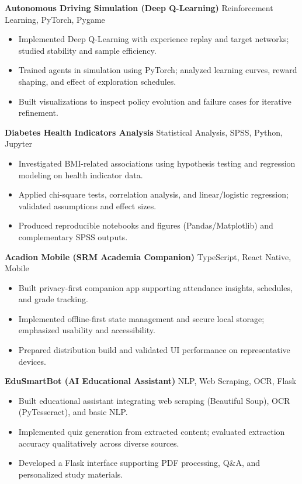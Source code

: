 \documentclass[10pt,a4paper]{article}
\begin{document}
\textbf{Autonomous Driving Simulation (Deep Q-Learning)} \hfill Reinforcement Learning, PyTorch, Pygame\\
\begin{itemize}
  \item Implemented Deep Q-Learning with experience replay and target networks; studied stability and sample efficiency.
  \item Trained agents in simulation using PyTorch; analyzed learning curves, reward shaping, and effect of exploration schedules.
  \item Built visualizations to inspect policy evolution and failure cases for iterative refinement.
\end{itemize}

\textbf{Diabetes Health Indicators Analysis} \hfill Statistical Analysis, SPSS, Python, Jupyter\\
\begin{itemize}
  \item Investigated BMI-related associations using hypothesis testing and regression modeling on health indicator data.
  \item Applied chi-square tests, correlation analysis, and linear/logistic regression; validated assumptions and effect sizes.
  \item Produced reproducible notebooks and figures (Pandas/Matplotlib) and complementary SPSS outputs.
\end{itemize}

\textbf{Acadion Mobile (SRM Academia Companion)} \hfill TypeScript, React Native, Mobile\\
\begin{itemize}
  \item Built privacy-first companion app supporting attendance insights, schedules, and grade tracking.
  \item Implemented offline-first state management and secure local storage; emphasized usability and accessibility.
  \item Prepared distribution build and validated UI performance on representative devices.
\end{itemize}

\textbf{EduSmartBot (AI Educational Assistant)} \hfill NLP, Web Scraping, OCR, Flask\\
\begin{itemize}
  \item Built educational assistant integrating web scraping (Beautiful Soup), OCR (PyTesseract), and basic NLP.
  \item Implemented quiz generation from extracted content; evaluated extraction accuracy qualitatively across diverse sources.
  \item Developed a Flask interface supporting PDF processing, Q\&A, and personalized study materials.
\end{itemize}
\end{document}
